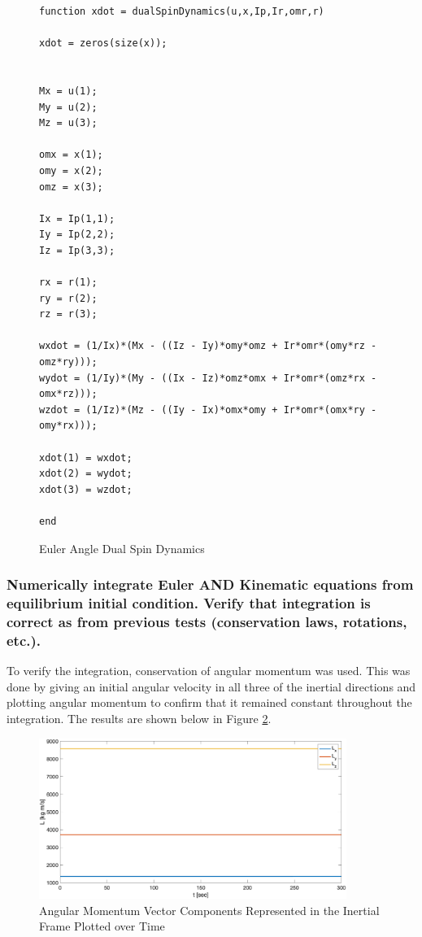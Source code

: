 \begin{figure} [H]
    \centering
    \begin{lstlisting}
function xdot = dualSpinDynamics(u,x,Ip,Ir,omr,r)

xdot = zeros(size(x));


Mx = u(1);
My = u(2);
Mz = u(3);

omx = x(1);
omy = x(2);
omz = x(3);

Ix = Ip(1,1);
Iy = Ip(2,2);
Iz = Ip(3,3);

rx = r(1);
ry = r(2);
rz = r(3);

wxdot = (1/Ix)*(Mx - ((Iz - Iy)*omy*omz + Ir*omr*(omy*rz - omz*ry)));
wydot = (1/Iy)*(My - ((Ix - Iz)*omz*omx + Ir*omr*(omz*rx - omx*rz)));
wzdot = (1/Iz)*(Mz - ((Iy - Ix)*omx*omy + Ir*omr*(omx*ry - omy*rx)));

xdot(1) = wxdot;
xdot(2) = wydot;
xdot(3) = wzdot;

end
    \end{lstlisting}
    \caption{Euler Angle Dual Spin Dynamics}
    \label{fig:dual_spin_simulink_code}
\end{figure}

\subsubsection{Numerically integrate Euler AND Kinematic equations from equilibrium initial condition. Verify
that integration is correct as from previous tests (conservation laws, rotations, etc.).}

To verify the integration, conservation of angular momentum was used. This was done by giving an initial angular velocity in all three of the inertial directions and plotting angular momentum to confirm that it remained constant throughout the integration. The results are shown below in Figure \ref{fig:mom_wheel_momentum_conservation}.

\begin{figure}[H]
    \centering
    \captionsetup{justification = centering}
    \includegraphics[width = 10cm]{Images/mom_wheel_angular_momentum.png}
    \caption{Angular Momentum Vector Components Represented in the Inertial Frame Plotted over Time}
    \label{fig:mom_wheel_momentum_conservation}
\end{figure}


